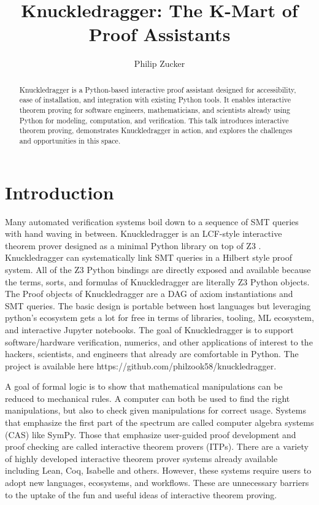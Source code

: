 \documentclass{article}%
\begin{document}
\title{Knuckledragger: The K-Mart of Proof Assistants}


\author{Philip Zucker}

\maketitle
\begin{abstract}
Knuckledragger is a Python-based interactive proof assistant designed for accessibility, ease of installation, and integration with existing Python tools. It enables interactive theorem proving for software engineers, mathematicians, and scientists already using Python for modeling, computation, and verification. This talk introduces interactive theorem proving, demonstrates Knuckledragger in action, and explores the challenges and opportunities in this space.
\end{abstract}


\section{Introduction}

Many automated verification systems boil down to a sequence of SMT
queries with hand waving in between. Knuckledragger is an LCF-style
interactive theorem prover designed as a minimal Python library on top
of Z3 \cite{z3solver}. Knuckledragger can systematically link SMT queries in a Hilbert
style proof system. All of the Z3 Python bindings are directly exposed
and available because the terms, sorts, and formulas of Knuckledragger
are literally Z3 Python objects. The Proof objects of Knuckledragger
are a DAG of axiom instantiations and SMT queries. The basic design is
portable between host languages but leveraging python's ecosystem gets
a lot for free in terms of libraries, tooling, ML ecosystem, and
interactive Jupyter notebooks. The goal of Knuckledragger is to
support software/hardware verification, numerics, and other
applications of interest to the hackers, scientists, and engineers
that already are comfortable in Python. The project is available here
https://github.com/philzook58/knuckledragger.

A goal of formal logic is to show that mathematical manipulations can be reduced to mechanical rules. A computer can both be used to find the right manipulations, but also to check given manipulations for correct usage. Systems that emphasize the first part of the spectrum are called computer algebra systems (CAS) like SymPy. Those that emphasize user-guided proof development and proof checking are called interactive theorem provers (ITPs). There are a variety of highly developed interactive theorem prover systems already available including Lean, Coq, Isabelle and others. However, these systems require users to adopt new languages, ecosystems, and workflows. These are unnecessary barriers to the uptake of the fun and useful ideas of interactive theorem proving.
\end{document}
